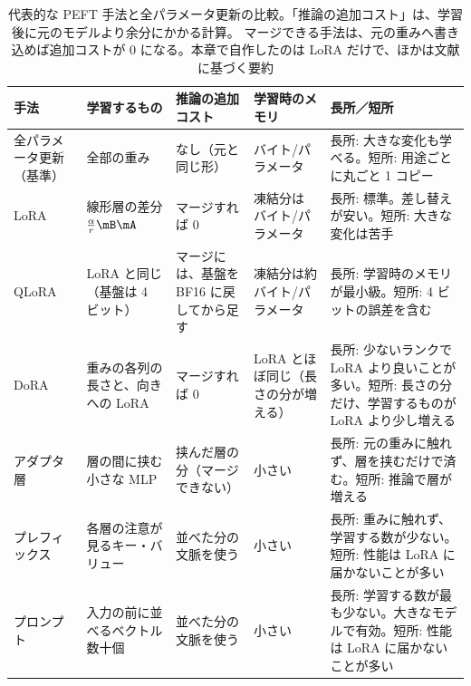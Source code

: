 \begin{table}[tbp]
\centering
\caption{代表的な PEFT 手法と全パラメータ更新の比較。「推論の追加コスト」は、学習後に元のモデルより余分にかかる計算。
マージできる手法は、元の重みへ書き込めば追加コストが 0 になる。本章で自作したのは LoRA だけで、ほかは文献に基づく要約}
\label{tab:lora-methods}
\footnotesize
\begin{tabular}{@{}>{\raggedright\arraybackslash}p{1.7cm}>{\raggedright\arraybackslash}p{2.6cm}>{\raggedright\arraybackslash}p{2.0cm}>{\raggedright\arraybackslash}p{2.0cm}>{\raggedright\arraybackslash}p{3.0cm}@{}}
\toprule
手法 & 学習するもの & 推論の追加コスト & 学習時のメモリ & 長所／短所 \\
\midrule
全パラメータ更新（基準） & 全部の重み & なし（元と同じ形） & 16 バイト/\newline パラメータ & 長所: 大きな変化も学べる。短所: 用途ごとに丸ごと 1 コピー \\\addlinespace
LoRA\cite{hu2022lora} & 線形層の差分 $\frac{\alpha}{r}\mB\mA$ & マージすれば 0 & 凍結分は\newline 2 バイト/\newline パラメータ & 長所: 標準。差し替えが安い。短所: 大きな変化は苦手 \\\addlinespace
QLoRA\cite{dettmers2023qlora} & LoRA と同じ（基盤は 4 ビット） & マージには、基盤を BF16 に戻してから足す & 凍結分は約\newline 0.5 バイト/\newline パラメータ & 長所: 学習時のメモリが最小級。短所: 4 ビットの誤差を含む \\\addlinespace
DoRA\cite{liu2024dora} & 重みの各列の長さと、向きへの LoRA & マージすれば 0 & LoRA とほぼ同じ（長さの分が増える） & 長所: 少ないランクで LoRA より良いことが多い。短所: 長さの分だけ、学習するものが LoRA より少し増える \\\addlinespace
アダプタ層\cite{houlsby2019parameter} & 層の間に挟む小さな MLP & 挟んだ層の分（マージできない） & 小さい & 長所: 元の重みに触れず、層を挟むだけで済む。短所: 推論で層が増える \\\addlinespace
プレフィックス\cite{li2021prefix} & 各層の注意が見るキー・バリュー & 並べた分の文脈を使う & 小さい & 長所: 重みに触れず、学習する数が少ない。短所: 性能は LoRA に届かないことが多い \\\addlinespace
プロンプト\cite{lester2021power} & 入力の前に並べるベクトル数十個 & 並べた分の文脈を使う & 小さい & 長所: 学習する数が最も少ない。大きなモデルで有効。短所: 性能は LoRA に届かないことが多い \\
\bottomrule
\end{tabular}
\end{table}


